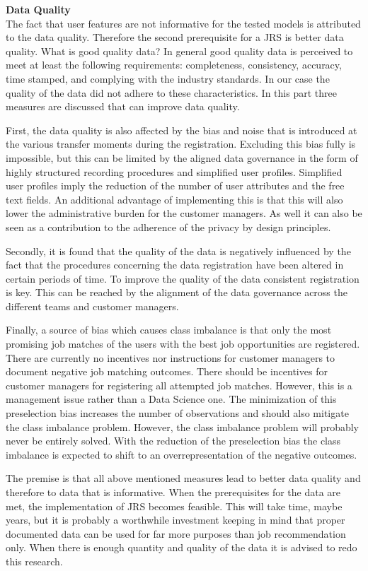 \noindent
\textbf{Data Quality}\\
The fact that user features are not informative for the tested models is attributed to the data quality. 
Therefore the second prerequisite for a JRS is better data quality.
What is good quality data?
In general good quality data is perceived to meet at least the following requirements: completeness, consistency, accuracy, time stamped, and complying with the industry standards. 
In our case the quality of the data did not adhere to these characteristics. 
In this part three measures are discussed that can improve data quality.

First, the data quality is also affected by the bias and noise that is introduced at the various transfer moments during the registration.
Excluding this bias fully is impossible, but this can be limited by the aligned data governance in the form of highly structured recording procedures and simplified user profiles.
Simplified user profiles imply the reduction of the number of user attributes and the free text fields. 
An additional advantage of implementing this is that this will also lower the administrative burden for the customer managers.
As well it can also be seen as a contribution to the adherence of the privacy by design principles. 

Secondly, it is found that the quality of the data is negatively influenced by the fact that the procedures concerning the data registration have been altered in certain periods of time. 
To improve the quality of the data consistent registration is key.
This can be reached by the alignment of the data governance across the different teams and customer managers.

Finally, a source of bias which causes class imbalance is that only the most promising job matches of the users with the best job opportunities are registered. 
There are currently no incentives nor instructions for customer managers to document negative job matching outcomes. 
There should be incentives for customer managers for registering all attempted job matches.
However, this is a management issue rather than a Data Science one.
The minimization of this preselection bias increases the number of observations and should also mitigate the class imbalance problem.
However, the class imbalance problem will probably never be entirely solved.
With the reduction of the preselection bias the class imbalance is expected to shift to an overrepresentation of the negative outcomes.

The premise is that all above mentioned measures lead to better data quality and therefore to data that is informative.
When the prerequisites for the data are met, the implementation of JRS becomes feasible.
This will take time, maybe years, but it is probably a worthwhile investment keeping in mind that proper documented data can be used for far more purposes than job recommendation only.
When there is enough quantity and quality of the data it is advised to redo this research. 
